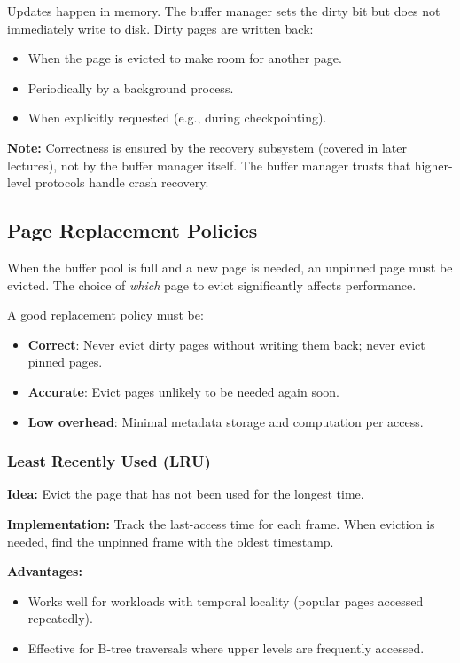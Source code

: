 Updates happen in memory. The buffer manager sets the dirty bit but does not immediately write to disk. Dirty pages are written back:
\begin{itemize}
    \item When the page is evicted to make room for another page.
    \item Periodically by a background process.
    \item When explicitly requested (e.g., during checkpointing).
\end{itemize}

\textbf{Note:} Correctness is ensured by the recovery subsystem (covered in later lectures), not by the buffer manager itself. The buffer manager trusts that higher-level protocols handle crash recovery.

\subsection{Page Replacement Policies}

When the buffer pool is full and a new page is needed, an unpinned page must be evicted. The choice of \textit{which} page to evict significantly affects performance.

A good replacement policy must be:
\begin{itemize}
    \item \textbf{Correct}: Never evict dirty pages without writing them back; never evict pinned pages.
    \item \textbf{Accurate}: Evict pages unlikely to be needed again soon.
    \item \textbf{Low overhead}: Minimal metadata storage and computation per access.
\end{itemize}

\subsubsection*{Least Recently Used (LRU)}

\textbf{Idea:} Evict the page that has not been used for the longest time.

\textbf{Implementation:} Track the last-access time for each frame. When eviction is needed, find the unpinned frame with the oldest timestamp.

\textbf{Advantages:}
\begin{itemize}
    \item Works well for workloads with temporal locality (popular pages accessed repeatedly).
    \item Effective for B-tree traversals where upper levels are frequently accessed.
\end{itemize}

